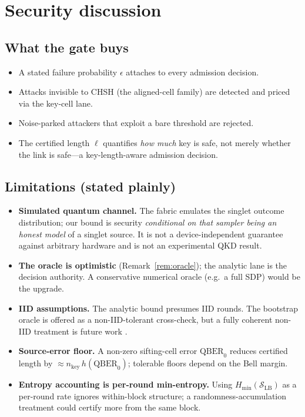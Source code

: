\documentclass[11pt,a4paper]{article}
\newcommand{\eps}{\epsilon}
\newcommand{\keylen}{n_{\mathrm{key}}}
\newcommand{\QBER}{\mathrm{QBER}}
\newcommand{\Hmin}{H_{\min}}
\newcommand{\SLB}{\mathcal{S}_{\mathrm{LB}}}
\newcommand{\bits}{\ell}
\theoremstyle{plain}
\theoremstyle{definition}
\begin{document}
\section{Security discussion}
\subsection{What the gate buys}
\begin{itemize}
  \item A stated failure probability $\eps$ attaches to every admission decision.
  \item Attacks invisible to CHSH (the aligned-cell family) are detected and
    priced via the key-cell lane.
  \item Noise-parked attackers that exploit a bare threshold are rejected.
  \item The certified length $\bits$ quantifies \emph{how much} key is safe, not
    merely whether the link is safe---a key-length-aware admission decision.
\end{itemize}

\subsection{Limitations (stated plainly)}
\begin{itemize}
  \item \textbf{Simulated quantum channel.} The fabric emulates the singlet
    outcome distribution; our bound is security \emph{conditional on that
    sampler being an honest model} of a singlet source. It is not a
    device-independent guarantee against arbitrary hardware and is not an
    experimental QKD result.
  \item \textbf{The oracle is optimistic} (Remark~\ref{rem:oracle}); the
    analytic lane is the decision authority. A conservative numerical oracle
    (e.g.\ a full SDP) would be the upgrade.
  \item \textbf{IID assumptions.} The analytic bound presumes IID rounds. The
    bootstrap oracle is offered as a non-IID-tolerant cross-check, but a
    fully coherent non-IID treatment is future work \citep{acín2007coherent}.
  \item \textbf{Source-error floor.} A non-zero sifting-cell error
    $\QBER_{0}$ reduces certified length by $\approx \keylen\,h(\QBER_{0})$;
    tolerable floors depend on the Bell margin.
  \item \textbf{Entropy accounting is per-round min-entropy.} Using
    $\Hmin(\SLB)$ as a per-round rate ignores within-block structure; a
    randomness-accumulation treatment could certify more from the same block.
\end{itemize}
\end{document}

